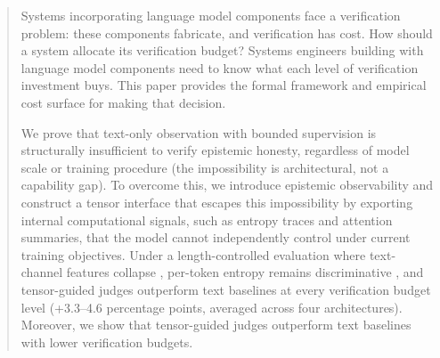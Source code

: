 \begin{abstract}
    Systems incorporating language model components face a verification problem:
    these components fabricate, and verification has cost. How should a system
    allocate its verification budget? 
    Systems engineers building with language model
    components need to know what each level of verification investment buys.
    This paper provides the formal framework and empirical cost surface for making that decision.
    
    We prove that text-only observation with
    bounded supervision is structurally insufficient to verify epistemic honesty,
    regardless of model scale or training procedure (the impossibility is
    architectural, not a capability gap). 
    To overcome this, we introduce epistemic observability and construct a tensor interface that
    escapes this impossibility by exporting internal computational signals, such as entropy traces and
    attention summaries, that the model cannot independently control under current training objectives.
    Under a length-controlled evaluation where text-channel features collapse
    , per-token entropy remains discriminative , and tensor-guided judges outperform
    text baselines at every verification budget level (+3.3--4.6 percentage points, averaged
    across four architectures). Moreover, we show that tensor-guided judges
    outperform text baselines with lower verification budgets.
    \end{abstract}
